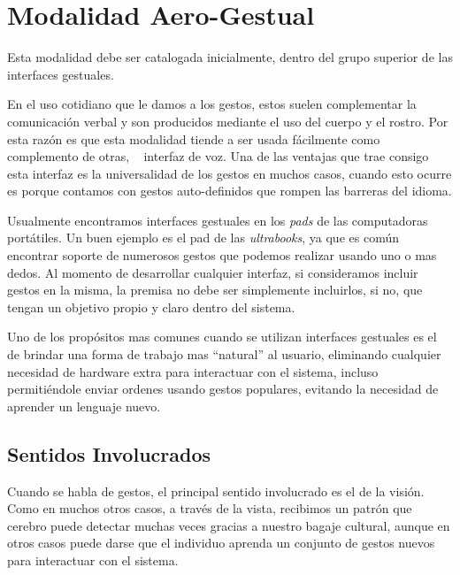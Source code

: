 
\chapter{Modalidad Aero-Gestual} %

\label{ch:mod_air} 
Esta modalidad debe ser catalogada inicialmente, dentro del grupo superior de las interfaces gestuales. 

En el uso cotidiano que le damos a los gestos, estos suelen complementar la comunicación verbal y son producidos mediante el uso del cuerpo y el rostro. Por esta razón es que esta modalidad tiende a ser usada fácilmente como complemento de otras, \ie~ interfaz de voz.
Una de las ventajas que trae consigo esta interfaz es la universalidad de los gestos en muchos casos, cuando esto ocurre es porque contamos con gestos auto-definidos que rompen las barreras del idioma.

Usualmente encontramos interfaces gestuales en los \emph{pads} de las computadoras portátiles. Un buen ejemplo es el pad de las \emph{ultrabooks}, ya que es común encontrar soporte de numerosos gestos que podemos realizar usando uno o mas dedos.
Al momento de desarrollar cualquier interfaz, si consideramos incluir gestos en la misma, la premisa no debe ser simplemente incluirlos, si no, que tengan un objetivo propio y claro dentro del sistema. 

Uno de los propósitos mas comunes cuando se utilizan interfaces gestuales es el de brindar una forma de trabajo mas ``natural'' al usuario, eliminando cualquier necesidad de hardware extra para interactuar con el sistema, incluso permitiéndole enviar ordenes usando gestos populares, evitando la necesidad de aprender un lenguaje nuevo.

\section{Sentidos Involucrados}
Cuando se habla de gestos, el principal sentido involucrado es el de la visión. Como en muchos otros casos, a través de la vista, recibimos un patrón que cerebro puede detectar muchas veces gracias a nuestro bagaje cultural, aunque en otros casos puede darse que el individuo aprenda un conjunto de gestos nuevos para interactuar con el sistema.

